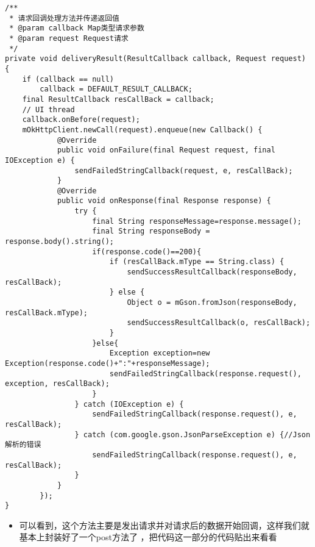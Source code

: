\documentclass[9pt, b5paper]{article}
\begin{document}
\begin{verbatim}
/**
 * 请求回调处理方法并传递返回值
 * @param callback Map类型请求参数
 * @param request Request请求
 */
private void deliveryResult(ResultCallback callback, Request request) {
    if (callback == null)
        callback = DEFAULT_RESULT_CALLBACK;
    final ResultCallback resCallBack = callback;
    // UI thread
    callback.onBefore(request);
    mOkHttpClient.newCall(request).enqueue(new Callback() {
            @Override
            public void onFailure(final Request request, final IOException e) {
                sendFailedStringCallback(request, e, resCallBack);
            }
            @Override
            public void onResponse(final Response response) {
                try {
                    final String responseMessage=response.message();
                    final String responseBody = response.body().string();
                    if(response.code()==200){
                        if (resCallBack.mType == String.class) {
                            sendSuccessResultCallback(responseBody, resCallBack);
                        } else {
                            Object o = mGson.fromJson(responseBody, resCallBack.mType);
                            sendSuccessResultCallback(o, resCallBack);
                        }
                    }else{
                        Exception exception=new Exception(response.code()+":"+responseMessage);
                        sendFailedStringCallback(response.request(), exception, resCallBack);
                    }
                } catch (IOException e) {
                    sendFailedStringCallback(response.request(), e, resCallBack);
                } catch (com.google.gson.JsonParseException e) {//Json解析的错误
                    sendFailedStringCallback(response.request(), e, resCallBack);
                }
            }
        });
}
\end{verbatim}
\begin{itemize}
\item 可以看到，这个方法主要是发出请求并对请求后的数据开始回调，这样我们就基本上封装好了一个post方法了  ，把代码这一部分的代码贴出来看看
\end{itemize}
\end{document}
